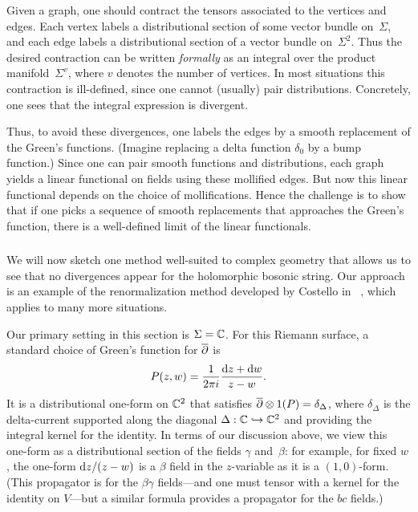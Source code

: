 Given a graph, one should contract the tensors associated to the vertices and edges.
Each vertex labels a distributional section of some vector bundle on~$\Sigma$,
and each edge labels a distributional section of a vector bundle on~$\Sigma^2$.
Thus the desired contraction can be written {\em formally} as an integral over the product manifold~$\Sigma^{v}$,
where $v$ denotes the number of vertices.
In most situations this contraction is ill-defined, 
since one cannot (usually) pair distributions.
Concretely, one sees that the integral expression is divergent.

Thus, to avoid these divergences, one labels the edges by a smooth replacement of the Green's functions. 
(Imagine replacing a delta function $\delta_0$ by a bump function.)
Since one can pair smooth functions and distributions,
each graph yields a linear functional on fields using these mollified edges.
But now this linear functional depends on the choice of mollifications.
Hence the challenge is to show that 
if one picks a sequence of smooth replacements that approaches the Green's function,
there is a well-defined limit of the linear functionals.

\subsubsection{}

We will now sketch one method well-suited to complex geometry
that allows us to see that no divergences appear for the holomorphic bosonic string.
Our approach is an example of the renormalization method developed by Costello in ~\cite{CosBook},
which applies to many more situations.

Our primary setting in this section is $\Sigma=\mathbb C$.
For this Riemann surface, a standard choice of Green's function for $\overline{\partial}$ is
\[
P(z,w) = \frac{1}{2 \pi i} \frac{{\rm d} z + {\rm d} w}{z-w}.
\]
It is a distributional one-form on $\mathbb C^2$ that satisfies $\overline{\partial} \otimes 1(P) = \delta_\Delta$, 
where $\delta_\Delta$ is the delta-current supported along the diagonal $\Delta: \mathbb C \hookrightarrow \mathbb C^2$ and providing the integral kernel for the identity.
In terms of our discussion above,
we view this one-form as a distributional section of the fields $\gamma$ and~$\beta$: 
for example, for fixed $w$, the one-form ${\rm d} z/(z - w)$ is a $\beta$ field in the $z$-variable 
as it is a $(1,0)$-form.
(This propagator is for the $\beta\gamma$ fields---and one must tensor with a kernel for the identity on $V$---but a similar formula provides a propagator for the $bc$ fields.)


